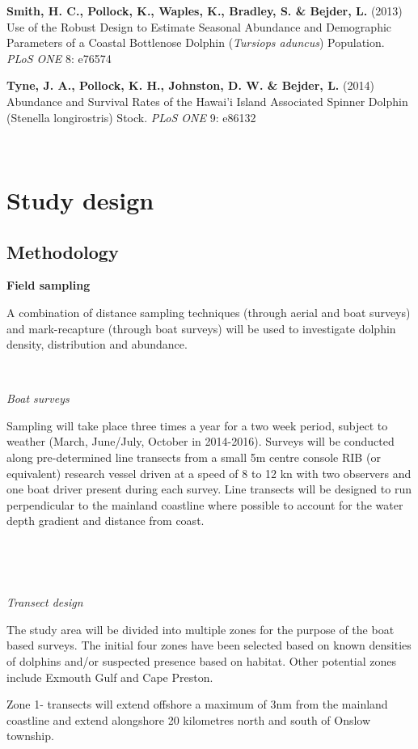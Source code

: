 \documentclass[version=last,
    paper=a4,                               %
    10pt,                                   %
    dvipsnames,
    oneside,                              %
    headings=openany,                       %
    open=any,
    BCOR=7mm,                               %
    DIV=15,     %
]{scrbook}
\begin{document}
\textbf{Smith, H. C., Pollock, K., Waples, K., Bradley, S. \& Bejder,
L.} (2013) Use of the Robust Design to Estimate Seasonal Abundance and
Demographic Parameters of a Coastal Bottlenose Dolphin (\emph{Tursiops
aduncus}) Population. \emph{PLoS ONE} 8: e76574

\textbf{Tyne, J. A., Pollock, K. H., Johnston, D. W. \& Bejder, L.}
(2014) Abundance and Survival Rates of the Hawai'i Island Associated
Spinner Dolphin (Stenella longirostris) Stock. \emph{PLoS ONE} 9: e86132

~



\section*{Study design}


\subsection*{Methodology}

\textbf{Field sampling}

A combination of distance sampling techniques (through aerial and boat
surveys) and mark-recapture (through boat surveys) will be used to
investigate dolphin density, distribution and abundance.

~

\emph{Boat surveys}

Sampling will take place three times a year for a two week period,
subject to weather (March, June/July, October in 2014-2016). Surveys
will be conducted along pre-determined line transects from a small 5m
centre console RIB (or equivalent) research vessel driven at a speed of
8 to 12 kn with two observers and one boat driver present during each
survey. Line transects will be designed to run perpendicular to the
mainland coastline where possible to account for the water depth
gradient and distance from coast.

~

\emph{~}

\emph{Transect design}

The study area will be divided into multiple zones for the purpose of
the boat based surveys. The initial four zones have been selected based
on known densities of dolphins and/or suspected presence based on
habitat. Other potential zones include Exmouth Gulf and Cape Preston.

Zone 1- transects will extend offshore a maximum of 3nm from the
mainland coastline and extend alongshore 20 kilometres north and south
of Onslow township.
\end{document}
